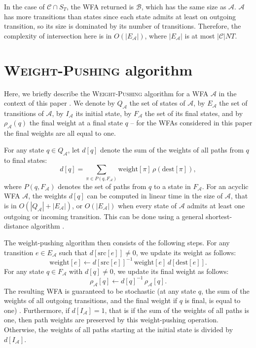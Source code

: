 \documentclass{article}
\newcommand{\sA}{\mathscr A}
\newcommand{\sB}{\mathscr B}
\newcommand{\sC}{\mathscr C}
\newcommand{\cO}{O}
\newcommand{\dest}{\mathrm{dest}}
\newcommand{\src}{\mathrm{src}}
\newcommand{\weight}{\mathrm{weight}}
\begin{document}
In the case of $\sC \cap S_T$, the WFA returned
is $\sB$, which has the same size as $\sA$. $\sA$ has more transitions than
states since each state admits at least on outgoing transition, so its size is
dominated by its number of transitions. Therefore, the complexity of
intersection here is in $\cO(|E_{\sA}|)$, where $|E_{\sA}|$ is at most
$|\sC|  NT$.

\section{\textsc{Weight-Pushing} algorithm}
\label{app:weightpush}

Here, we briefly describe the \textsc{Weight-Pushing} algorithm for a
WFA $\sA$ in the context of this paper \citep{Mohri1997bis,Mohri2009}.
We denote by $Q_{\sA}$ the set of states of $\sA$, by $E_\sA$ the set
of transitions of $\sA$, by $I_\sA$ its initial state, by $F_\sA$ the
set of its final states, and by $\rho_\sA(q)$ the final weight at a
final state $q$ -- for the WFAs considered in this paper the final
weights are all equal to one.

For any state $q \in Q_{\sA}$, let $d[q]$ denote the sum of the
weights of all paths from $q$ to final states:
\begin{equation*}
d[q] = \sum_{\pi \in P(q, F_{\sA})} \weight[\pi] \, \rho(\dest[\pi]),
\end{equation*}
where $P(q, F_{\sA})$ denotes the set of paths from $q$ to a state in
$F_{\sA}$. For an acyclic WFA $\sA$, the weights $d[q]$ can be
computed in linear time in the size of $\sA$, that is in
$\cO(|Q_\sA| + |E_{\sA}|)$, or $\cO(|E_{\sA}|)$ when every state of
$\sA$ admits at least one outgoing or incoming transition. This can be
done using a general shortest-distance algorithm
\citep{Mohri1997bis,Mohri2009}.

The weight-pushing algorithm then consists of the following
steps.  For any transition $e \in E_{\sA}$ such that
$d[\src[e]] \neq 0$, we update its weight as follows:
\begin{equation*}
  \weight[e] \leftarrow d[\src[e]]^{-1} \, \weight[e] \, d[\dest[e]].
\end{equation*}
For any state $q \in F_\sA$ with $d[q] \neq 0$, we update its final
weight as follows:
\begin{equation*}
\rho_\sA[q] \leftarrow d[q]^{-1} \, \rho_\sA[q].
\end{equation*}
The resulting WFA is guaranteed to be stochastic (at any state $q$,
the sum of the weights of all outgoing transitions, and the final
weight if $q$ is final, is equal to one)
\citep{Mohri2009}. Furthermore, if $d[I_{\sA}] = 1$, that is if the
sum of the weights of all paths is one, then path weights are
preserved by this weight-pushing operation. Otherwise, the weights of
all paths starting at the initial state is divided by $d[I_{\sA}]$.
\end{document}
